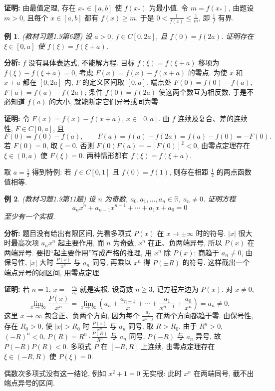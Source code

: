 \documentclass[UTF8,openany]{ctexbook}
\theoremstyle{chinesetextbook}
\newtheorem{example}{例}[section]
\newenvironment{cnproof}{\par\indent\textbf{证明:} \ignorespaces}{\par}
\begin{document}
\begin{cnproof}
由最值定理, 存在 $x_*\in[a,b]$ 使 $f(x_*)$ 为最小值. 令 $m=f(x_*)$, 由题设 $m>0$, 且每个 $x\in[a,b]$ 都有 $f(x)\ge m$. 于是 $\displaystyle0<\frac1{f(x)}\le\frac1m$, 即 $\displaystyle\frac1f$ 有界.
\end{cnproof}
\begin{example}
\textnormal{(教材习题1.9第6题)} 设 $a>0$, $f\in C[0,2a]$, 且 $f(0)=f(2a)$. 证明存在 $\xi\in[0,a]$ 使 $f(\xi)=f(\xi+a)$.
\end{example}
\par\indent\textbf{分析:} $f$ 没有具体表达式, 不能解方程. 目标 $f(\xi)=f(\xi+a)$ 移项为 $f(\xi)-f(\xi+a)=0$, 考虑 $F(x)=f(x)-f(x+a)$ 的零点. 为使 $x$ 和 $x+a$ 都在 $[0,2a]$ 内, $F$ 的定义区间取 $[0,a]$. 端点处 $F(0)=f(0)-f(a)$, $F(a)=f(a)-f(2a)$; 条件 $f(0)=f(2a)$ 使这两个数互为相反数, 于是不必知道 $f(a)$ 的大小, 就能断定它们异号或同为零.
\begin{cnproof}
令 $F(x)=f(x)-f(x+a)$, $x\in[0,a]$. 由 $f$ 连续及复合、差的连续性, $F\in C[0,a]$, 且
\[
F(0)=f(0)-f(a),\qquad F(a)=f(a)-f(2a)=f(a)-f(0)=-F(0).
\]
若 $F(0)=0$, 取 $\xi=0$. 否则 $F(0)F(a)=-[F(0)]^2<0$, 由零点定理存在 $\xi\in(0,a)$ 使 $F(\xi)=0$. 两种情形都有 $f(\xi)=f(\xi+a)$.
\end{cnproof}
取 $\displaystyle a=\frac12$ 得到特例: 若 $f\in C[0,1]$ 且 $f(0)=f(1)$, 则存在相距 $\displaystyle\frac12$ 的两点函数值相等.
\begin{example}
\textnormal{(教材习题1.9第11题)} 设 $n$ 为奇数, $a_0,a_1,\ldots,a_n\in\mathbb R$, $a_n\ne0$. 证明方程
\[
a_nx^n+a_{n-1}x^{n-1}+\cdots+a_1x+a_0=0
\]
至少有一个实根.
\end{example}
\par\indent\textbf{分析:} 题目没有给出有限区间, 先看多项式 $P(x)$ 在 $x\to\pm\infty$ 时的符号. $|x|$ 很大时最高次项 $a_nx^n$ 起主要作用, 而 $n$ 为奇数, $x^n$ 在正、负两端异号, 所以 $P(x)$ 在两端异号. 要把“起主要作用”写成严格的推理, 用 $x^n$ 除 $P(x)$: 商趋于 $a_n\ne0$, 由保号性, $|x|$ 大时 $\displaystyle\frac{P(x)}{x^n}$ 与 $a_n$ 同号, 再乘以 $x^n$ 得 $P(\pm R)$ 的符号. 这样截出一个端点异号的闭区间, 用零点定理.
\begin{cnproof}
若 $n=1$, $\displaystyle x=-\frac{a_0}{a_1}$ 就是实根. 设奇数 $n\ge3$, 记方程左边为 $P(x)$. 对 $x\ne0$,
\[
\lim_{x\to\infty}\frac{P(x)}{x^n}
=\lim_{x\to\infty}\left(a_n+\frac{a_{n-1}}x+\cdots+\frac{a_1}{x^{n-1}}+\frac{a_0}{x^n}\right)
=a_n\ne0,
\]
这里 $x\to\infty$ 包含正、负两个方向, 因为每个 $\displaystyle\frac{a_j}{x^{n-j}}$ 在两个方向都趋于零. 由保号性, 存在 $R_0>0$, 使 $|x|>R_0$ 时 $\displaystyle\frac{P(x)}{x^n}$ 与 $a_n$ 同号. 取 $R>R_0$. 由于 $R^n>0$, $(-R)^n<0$, $P(R)=R^n\cdot\frac{P(R)}{R^n}$ 与 $a_n$ 同号, $P(-R)$ 与 $a_n$ 异号, 故 $P(-R)P(R)<0$. 多项式 $P$ 在 $[-R,R]$ 上连续, 由零点定理存在 $\xi\in(-R,R)$ 使 $P(\xi)=0$.
\end{cnproof}
偶数次多项式没有这一结论, 例如 $x^2+1=0$ 无实根: 此时 $x^n$ 在两端同号, 截不出端点异号的区间.
\end{document}
